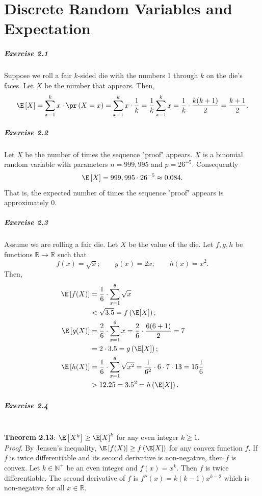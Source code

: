 \chapter{Discrete Random Variables and Expectation}

\paragraph{Exercise 2.1} Suppose we roll a fair $k$-sided die with the numbers 1
through $k$ on the die’s faces. Let $X$ be the number that appears. Then,
\[
  \E\left[X\right]
  = \sum_{x=1}^k x \cdot \pr\left(X = x\right)
  = \sum_{x=1}^k x \cdot \frac{1}{k}
  = \frac{1}{k} \sum_{x=1}^k x
  = \frac{1}{k} \cdot \frac{k(k+1)}{2}
  = \frac{k+1}{2}.
\]

\paragraph{Exercise 2.2} Let $X$ be the number of times the sequence "proof"
appears. $X$ is a binomial random variable with parameters $n = 999,995$ and
$p = 26^{-5}$. Consequently
\[
  \E\left[ X \right] = 999,995 \cdot 26^{-5} \approx 0.084.
\]
That is, the expected number of times the sequence "proof" appears is
approximately 0.

\paragraph{Exercise 2.3} Assume we are rolling a fair die. Let $X$ be the value
of the die. Let $f,g,h$ be functions $\mathbb{R} \to \mathbb{R}$ such that
\[
  f(x) = \sqrt{x}; \quad \quad g(x) = 2x; \quad \quad h(x) = x^2.
\]
Then,
\begin{align*}
  \E\left[ f(X) \right]
    &= \frac{1}{6} \cdot \sum_{x=1}^6 \sqrt{x} \\
    &< \sqrt{3.5} = f\left( \E[X] \right); \\
  \E\left[ g(X) \right]
    &= \frac{2}{6} \cdot \sum_{x=1}^6 x = \frac{2}{6} \cdot \frac{6(6+1)}{2} = 7 \\
    &= 2 \cdot 3.5 = g\left( \E[X] \right); \\
  \E\left[ h(X) \right]
    &= \frac{1}{6} \cdot \sum_{x=1}^6 \sqrt{x^2} = \frac{1}{6^2} \cdot 6 \cdot 7 \cdot 13 = 15 \frac{1}{6} \\
    &> 12.25 = 3.5^2 = h\left( \E[X] \right).
\end{align*}

\paragraph{Exercise 2.4} $~$ \\[0.2cm]
\textbf{Theorem 2.13}: $\E\left[X^k \right] \geq \E[X]^k$ for any even integer
$k \geq 1$. \\[0.2cm]
\textit{Proof}. By Jensen's inequality, $\E\left[f(X)\right] \geq f\left(\E[X]\right)$
for any convex function $f$. If $f$ is twice differentiable and its second
derivative is non-negative, then $f$ is convex. Let $k \in \mathbb{N}^+$ be an
even integer and $f(x) = x^k$. Then $f$ is twice differentiable. The second
derivative of $f$ is $f''(x) = k(k - 1)x^{k-2}$ which is non-negative for all
$x \in \mathbb{R}$.

